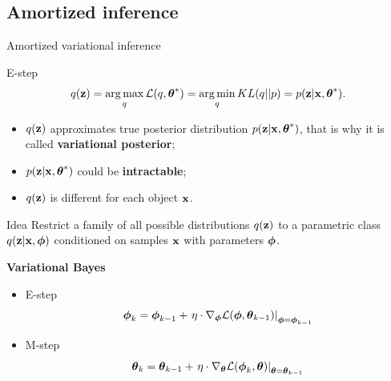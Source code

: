 \subsection{Amortized inference}
\begin{frame}{Amortized variational inference}
	\begin{block}{E-step}
		\vspace{-0.3cm}
		\[
		q(\mathbf{z}) = \operatorname*{arg\,max}_q \mathcal{L} (q, \boldsymbol{\theta}^*) = \operatorname*{arg\,min}_q KL(q || p) =
		p(\mathbf{z}| \mathbf{x}, \boldsymbol{\theta}^*).
		\]
		\vspace{-0.3cm}
		\begin{itemize}
			\item $q(\mathbf{z})$ approximates true posterior distribution $p(\mathbf{z}| \mathbf{x}, \boldsymbol{\theta}^*)$, that is why it is called \textbf{variational posterior};
			\item $p(\mathbf{z}| \mathbf{x}, \boldsymbol{\theta}^*)$ could be \textbf{intractable};
			\item $q(\mathbf{z})$ is different for each object $\mathbf{x}$.
		\end{itemize}
		\vspace{-0.3cm}
	\end{block}
	\begin{block}{Idea}
		Restrict a family of all possible distributions $q(\mathbf{z})$ to a parametric class $q(\mathbf{z}|\mathbf{x}, \boldsymbol{\phi})$ conditioned on samples $\mathbf{x}$ with parameters $\boldsymbol{\phi}$.
	\end{block}
	
	\textbf{Variational Bayes}
	\begin{itemize}
		\item E-step
		\[
			\boldsymbol{\phi}_k = \boldsymbol{\phi}_{k-1} + \left.\eta \cdot \nabla_{\boldsymbol{\phi}} \mathcal{L}(\boldsymbol{\phi}, \boldsymbol{\theta}_{k-1})\right|_{\boldsymbol{\phi}=\boldsymbol{\phi}_{k-1}}
		\]
		\item M-step
		\[
			\boldsymbol{\theta}_k = \boldsymbol{\theta}_{k-1} + \left.\eta \cdot \nabla_{\boldsymbol{\theta}} \mathcal{L}(\boldsymbol{\phi}_k, \boldsymbol{\theta})\right|_{\boldsymbol{\theta}=\boldsymbol{\theta}_{k-1}}
		\]
	\end{itemize}
\end{frame}
